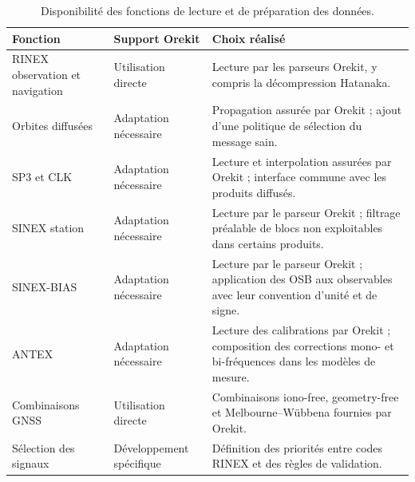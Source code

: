 \begin{table}[H]
\centering
\caption{Disponibilité des fonctions de lecture et de préparation des données.}
\label{tab:orekit_data_support}
\small
\begin{tabularx}{\textwidth}{p{3.3cm} p{3.0cm} X}
\hline
\textbf{Fonction} & \textbf{Support Orekit} & \textbf{Choix réalisé} \\
\hline
RINEX observation et navigation & Utilisation directe &
Lecture par les parseurs Orekit, y compris la décompression Hatanaka. \\

Orbites diffusées & Adaptation nécessaire &
Propagation assurée par Orekit ; ajout d'une politique de sélection du message
sain. \\

SP3 et CLK & Adaptation nécessaire &
Lecture et interpolation assurées par Orekit ; interface commune avec les
produits diffusés. \\

SINEX station & Adaptation nécessaire &
Lecture par le parseur Orekit ; filtrage préalable de blocs non exploitables
dans certains produits. \\

SINEX-BIAS & Adaptation nécessaire &
Lecture par le parseur Orekit ; application des OSB aux observables avec leur
convention d'unité et de signe. \\

ANTEX & Adaptation nécessaire &
Lecture des calibrations par Orekit ; composition des corrections mono- et
bi-fréquences dans les modèles de mesure. \\

Combinaisons GNSS & Utilisation directe &
Combinaisons iono-free, geometry-free et Melbourne--Wübbena fournies
par Orekit. \\

Sélection des signaux & Développement spécifique &
Définition des priorités entre codes RINEX et des règles de validation. \\
\hline
\end{tabularx}
\end{table}

